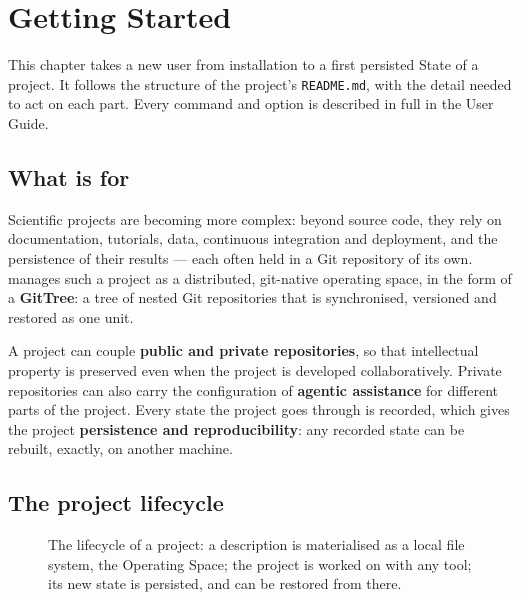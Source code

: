 
\chapter{Getting Started}
\label{chap:getting-started}

This chapter takes a new user from installation to a first persisted State of
a project. It follows the structure of the project's \texttt{README.md}, with
the detail needed to act on each part. Every command and option is described
in full in the User Guide.

\section{What \cgspkg{} is for}

Scientific projects are becoming more complex: beyond source code, they rely
on documentation, tutorials, data, continuous integration and deployment, and
the persistence of their results --- each often held in a Git repository of
its own. \cgspkg{} manages such a project as a distributed, git-native
operating space, in the form of a \textbf{GitTree}: a tree of nested Git
repositories that is synchronised, versioned and restored as one unit.

A project can couple \textbf{public and private repositories}, so that
intellectual property is preserved even when the project is developed
collaboratively. Private repositories can also carry the configuration of
\textbf{agentic assistance} for different parts of the project. Every state
the project goes through is recorded, which gives the project
\textbf{persistence and reproducibility}: any recorded state can be rebuilt,
exactly, on another machine.

\section{The project lifecycle}
\label{sec:project-lifecycle}

\begin{figure}[ht]
\centering

\caption{The lifecycle of a project: a description is materialised as a local
  file system, the Operating Space; the project is worked on with any tool;
  its new state is persisted, and can be restored from there.}
\label{fig:project-lifecycle}
\end{figure}

